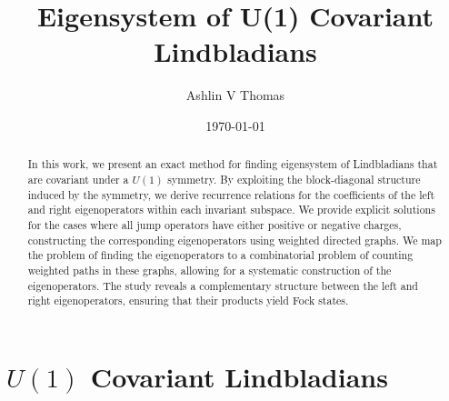 \documentclass[11pt,a4paper]{article}
\title{Eigensystem of U(1) Covariant Lindbladians}
\author{Ashlin V Thomas}
\date{\today}
\begin{document}
\maketitle

\begin{abstract}
    In this work, we present an exact method for finding eigensystem of Lindbladians that are covariant under a $U(1)$ symmetry. By exploiting the block-diagonal structure induced by the symmetry, we derive recurrence relations for the coefficients of the left and right eigenoperators within each invariant subspace. 
    We provide explicit solutions for the cases where all jump operators have either positive or negative charges, constructing the corresponding eigenoperators using weighted directed graphs. 
    We map the problem of finding the eigenoperators to a combinatorial problem of counting weighted paths in these graphs, allowing for a systematic construction of the eigenoperators.
    The study reveals a complementary structure between the left and right eigenoperators, ensuring that their products yield Fock states. 
\end{abstract}

\section{$U(1)$ Covariant Lindbladians}
\end{document}
